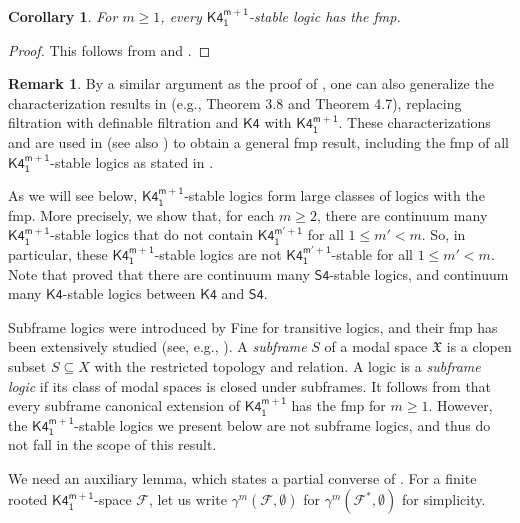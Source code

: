 \documentclass[a4paper,11pt]{article}
\newtheorem{corollary}[theorem]{Corollary}
\theoremstyle{definition}
\newtheorem{remark}[theorem]{Remark}
\theoremstyle{remark}
\numberwithin{theorem}{section}
\renewcommand{\sp}[1]{\mathfrak{#1}}
\newcommand{\X}{\sp{X}}
\newcommand{\fr}[1]{\mathcal{#1}}
\newcommand{\F}{\fr{F}}
\newcommand{\logic}[1]{\mathsf{#1}}
\newcommand{\Kf}{\logic{K4}}
\newcommand{\Kff}[2]{\logic{K4^{#1}_{#2}}}
\newcommand{\emp}{\emptyset}
\begin{document}
\begin{corollary} \label{3: Cor K4m1-stable fmp}
    For $m \geq 1$, every $\Kff{m+1}{1}$-stable logic has the fmp.
\end{corollary}

\begin{proof}
    This follows from  and .
\end{proof}

\begin{remark}
    By a similar argument as the proof of , one can also generalize the characterization results in \cite{stablemodallogic} (e.g., Theorem 3.8 and Theorem 4.7), replacing filtration with definable filtration and $\Kf$ with $\Kff{m+1}{1}$. These characterizations and  are used in \cite{takahashi2025choppingfinelyfinitecountermodels} (see also \cite[Chapter 4]{TakahashiThesis}) to obtain a general fmp result, including the fmp of all $\Kff{m+1}{1}$-stable logics as stated in .
\end{remark}

As we will see below, $\Kff{m+1}{1}$-stable logics form large classes of logics with the fmp. More precisely, we show that, for each $m \geq 2$, there are continuum many $\Kff{m+1}{1}$-stable logics that do not contain $\Kff{m'+1}{1}$ for all $1 \leq m' < m$. So, in particular, these $\Kff{m+1}{1}$-stable logics are not $\Kff{m'+1}{1}$-stable for all $1 \leq m' < m$. Note that \cite[Theorem 5.6]{stablemodallogic} proved that there are continuum many $\logic{S4}$-stable logics, and continuum many $\Kf$-stable logics between $\Kf$ and $\logic{S4}$.

Subframe logics were introduced by Fine \cite{fineK4II} for transitive logics, and their fmp has been extensively studied (see, e.g., \cite[Section 11.3]{czModalLogic1997}). A \emph{subframe} $S$ of a modal space $\X$ is a clopen subset $S \subseteq X$ with the restricted topology and relation. A logic is a \emph{subframe logic} if its class of modal spaces is closed under subframes. It follows from \cite[Theorem 39]{TwoTypesFiltrations2025} that every subframe canonical extension of $\Kff{m+1}{1}$ has the fmp for $m \geq 1$. However, the $\Kff{m+1}{1}$-stable logics we present below are not subframe logics, and thus do not fall in the scope of this result.

We need an auxiliary lemma, which states a partial converse of . For a finite rooted $\Kff{m+1}{1}$-space $\F$, let us write $\gamma^m(\F, \emp)$ for $\gamma^m(\F^*, \emp)$ for simplicity. 
\end{document}

